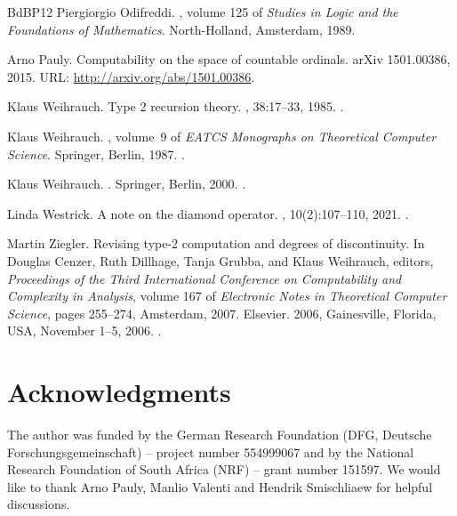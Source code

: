 \documentclass[11pt,a4paper]{amsart}
\theoremstyle{plain}
\theoremstyle{definition}
\theoremstyle{defC}
\theoremstyle{thmC}
\theoremstyle{plain}
\numberwithin{equation}{section}
\begin{document}
\begin{thebibliography}{BdBP12}
Piergiorgio Odifreddi.
, volume 125 of {\em Studies in Logic
  and the Foundations of Mathematics}.
\newblock North-Holland, Amsterdam, 1989.

Arno Pauly.
\newblock Computability on the space of countable ordinals.
\newblock arXiv 1501.00386, 2015.
\newblock URL: \url{http://arxiv.org/abs/1501.00386}.

Klaus Weihrauch.
\newblock Type 2 recursion theory.
, 38:17--33, 1985.
\newblock \href {https://doi.org/10.1016/0304-3975(85)90207-5}
  {}.

Klaus Weihrauch.
, volume~9 of {\em EATCS Monographs on Theoretical
  Computer Science}.
\newblock Springer, Berlin, 1987.
\newblock \href {https://doi.org/10.1007/978-3-642-69965-8}
  {}.

Klaus Weihrauch.
.
\newblock Springer, Berlin, 2000.
\newblock \href {https://doi.org/10.1007/978-3-642-56999-9}
  {}.

Linda Westrick.
\newblock A note on the diamond operator.
, 10(2):107--110, 2021.
\newblock \href {https://doi.org/10.3233/COM-200295}
  {}.

Martin Ziegler.
\newblock Revising type-2 computation and degrees of discontinuity.
\newblock In Douglas Cenzer, Ruth Dillhage, Tanja Grubba, and Klaus Weihrauch,
  editors, {\em Proceedings of the Third International Conference on
  Computability and Complexity in Analysis}, volume 167 of {\em Electronic
  Notes in Theoretical Computer Science}, pages 255--274, Amsterdam, 2007.
  Elsevier.
 2006, Gainesville, Florida, USA, November 1--5, 2006.
\newblock \href {https://doi.org/10.1016/j.entcs.2006.08.015}
  {}.

\end{thebibliography}



\section*{Acknowledgments}
The author was funded by the German Research Foundation (DFG, Deutsche Forschungsgemeinschaft) -- project number 554999067 and by the National Research Foundation of South Africa (NRF) -- grant number 151597.
We would like to thank Arno Pauly, Manlio Valenti and Hendrik Smischliaew for helpful discussions.
\end{document}
